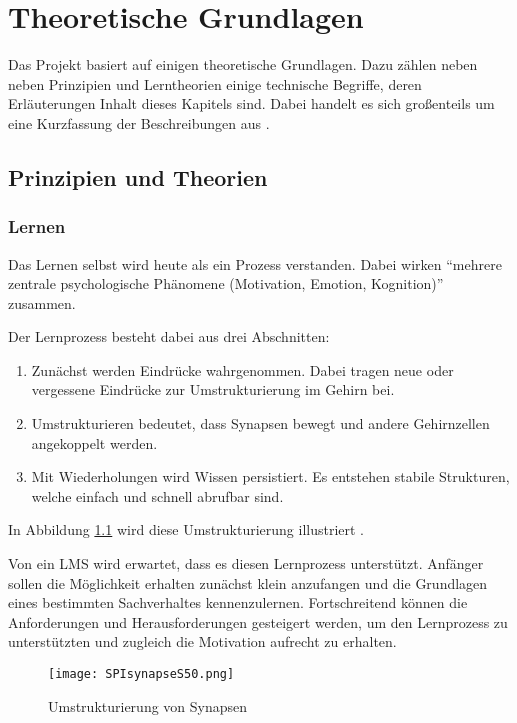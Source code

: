 \chapter{Theoretische Grundlagen}
Das Projekt basiert auf einigen theoretische Grundlagen. Dazu zählen
neben neben Prinzipien und Lerntheorien einige technische Begriffe, deren
Erläuterungen Inhalt dieses Kapitels sind. Dabei handelt es sich großenteils um
eine Kurzfassung der Beschreibungen aus \cite{gruben:2012}.

\section{Prinzipien und Theorien}
\subsection{Lernen}
Das Lernen selbst wird heute als ein Prozess verstanden. Dabei wirken "`mehrere
zentrale psychologische Phänomene (Motivation, Emotion,
Kognition)"'\cite{niegemann:2004} zusammen.

Der Lernprozess besteht dabei aus drei Abschnitten:
\begin{enumerate}
  \item Zunächst werden Eindrücke wahrgenommen. Dabei tragen neue oder
  vergessene Eindrücke zur Umstrukturierung im Gehirn bei.
  \item Umstrukturieren bedeutet, dass Synapsen bewegt und andere Gehirnzellen
  angekoppelt werden.
  \item Mit Wiederholungen wird Wissen persistiert. Es entstehen stabile
  Strukturen, welche einfach und schnell abrufbar sind.
\end{enumerate}
In Abbildung \ref{pic:structSyn} wird diese Umstrukturierung illustriert
\cite{spitzer:2012}.

Von ein LMS wird erwartet, dass es diesen Lernprozess unterstützt. Anfänger
sollen die Möglichkeit erhalten zunächst klein anzufangen und die Grundlagen
eines bestimmten Sachverhaltes kennenzulernen. Fortschreitend können die
Anforderungen und Herausforderungen gesteigert werden, um den Lernprozess zu
unterstützten und zugleich die Motivation aufrecht zu erhalten.

\begin{figure}[H]
\centering
\texttt{[image: SPIsynapseS50.png]}
\caption{Umstrukturierung von Synapsen \footnotemark}\label{pic:structSyn}
\end{figure}

